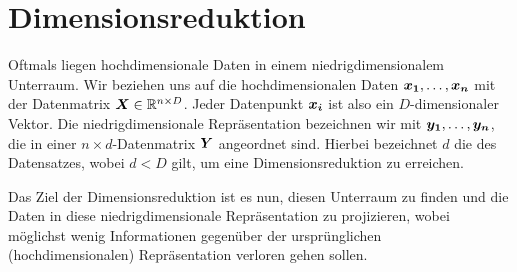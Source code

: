\chapter{Dimensionsreduktion}
\label{ch:Dimensionsreduktion}

Oftmals liegen hochdimensionale Daten in einem niedrigdimensionalem Unterraum. Wir beziehen uns auf die hochdimensionalen Daten $\boldsymbol{x_1},\ldots,\boldsymbol{x_n}$ mit der Datenmatrix $\boldsymbol{X} \in \mathbb{R}^{n \times D}$. Jeder Datenpunkt $\boldsymbol{x_i}$ ist also ein $D$-dimensionaler Vektor. Die niedrigdimensionale Repräsentation bezeichnen wir mit $\boldsymbol{y_1},\ldots,\boldsymbol{y_n}$, die in einer $n \times d$-Datenmatrix $\boldsymbol{Y}$ angeordnet sind. Hierbei bezeichnet $d$ die
 des Datensatzes, wobei $d < D$ gilt, um eine Dimensionsreduktion zu erreichen.


Das Ziel der Dimensionsreduktion ist es nun, diesen Unterraum zu finden und die Daten in diese niedrigdimensionale Repräsentation zu projizieren, wobei möglichst wenig Informationen gegenüber der ursprünglichen (hochdimensionalen) Repräsentation verloren gehen sollen.